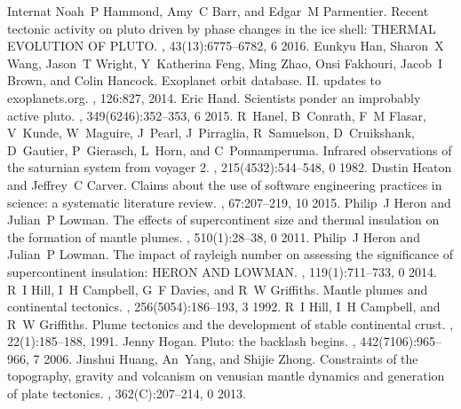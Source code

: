 \documentclass[letterpaper,10pt,english]{jupyterBook}
\begin{document}
\begin{sphinxthebibliography}{Internat}
\sphinxAtStartPar
Noah P Hammond, Amy C Barr, and Edgar M Parmentier. Recent tectonic activity on pluto driven by phase changes in the ice shell: THERMAL EVOLUTION OF PLUTO. , 43(13):6775–6782, 6 2016.
\sphinxAtStartPar
Eunkyu Han, Sharon X Wang, Jason T Wright, Y Katherina Feng, Ming Zhao, Onsi Fakhouri, Jacob I Brown, and Colin Hancock. Exoplanet orbit database. II. updates to exoplanets.org. , 126:827, 2014.
\sphinxAtStartPar
Eric Hand. Scientists ponder an improbably active pluto. , 349(6246):352–353, 6 2015.
\sphinxAtStartPar
R Hanel, B Conrath, F M Flasar, V Kunde, W Maguire, J Pearl, J Pirraglia, R Samuelson, D Cruikshank, D Gautier, P Gierasch, L Horn, and C Ponnamperuma. Infrared observations of the saturnian system from voyager 2. , 215(4532):544–548, 0 1982.
\sphinxAtStartPar
Dustin Heaton and Jeffrey C Carver. Claims about the use of software engineering practices in science: a systematic literature review. , 67:207–219, 10 2015.
\sphinxAtStartPar
Philip J Heron and Julian P Lowman. The effects of supercontinent size and thermal insulation on the formation of mantle plumes. , 510(1):28–38, 0 2011.
\sphinxAtStartPar
Philip J Heron and Julian P Lowman. The impact of rayleigh number on assessing the significance of supercontinent insulation: HERON AND LOWMAN. , 119(1):711–733, 0 2014.
\sphinxAtStartPar
R I Hill, I H Campbell, G F Davies, and R W Griffiths. Mantle plumes and continental tectonics. , 256(5054):186–193, 3 1992.
\sphinxAtStartPar
R I Hill, I H Campbell, and R W Griffiths. Plume tectonics and the development of stable continental crust. , 22(1):185–188, 1991.
\sphinxAtStartPar
Jenny Hogan. Pluto: the backlash begins. , 442(7106):965–966, 7 2006.
\sphinxAtStartPar
Jinshui Huang, An Yang, and Shijie Zhong. Constraints of the topography, gravity and volcanism on venusian mantle dynamics and generation of plate tectonics. , 362(C):207–214, 0 2013.

\end{sphinxthebibliography}
\end{document}
